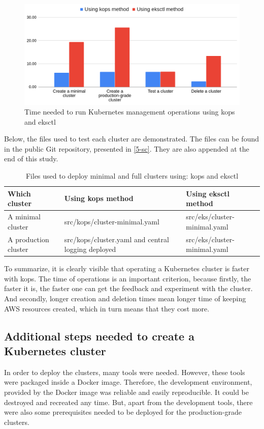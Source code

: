 \begin{figure}[H]
    \centering
    \includegraphics[width=15cm]{figures/k8s-time.png}
    \captionsetup{justification=centering,margin=2cm}
    \caption{Time needed to run Kubernetes management operations using kops and eksctl}
\end{figure}


Below, the files used to test each cluster are demonstrated. The files can be found in the public Git repository, presented in \ref{5-sc}. They are also appended at the end of this study.
\begin{table}[H]
\small
\begin{tabularx}{1\textwidth} {
  | >{\centering\arraybackslash}X
  | >{\centering\arraybackslash}X
  | >{\centering\arraybackslash}X |}
 \hline
  \textbf{Which cluster} & \textbf{Using kops method} & \textbf{Using eksctl method} \\
 \hline
 A minimal cluster & src/kops/cluster-minimal.yaml & src/eks/cluster-minimal.yaml \\
 \hline
 A production cluster & src/kops/cluster.yaml and central logging deployed & src/eks/cluster-minimal.yaml \\
 \hline
\end{tabularx}
\caption{\label{tab:comparison-which-file}Files used to deploy minimal and full clusters using: kops and eksctl}
\end{table}

To summarize, it is clearly visible that operating a Kubernetes cluster is faster with kops. The time of operations is an important criterion, because firstly, the faster it is, the faster one can get the feedback and experiment with the cluster. And secondly, longer creation and deletion times mean longer time of keeping AWS resources created, which in turn means that they cost more.

\subsection{Additional steps needed to create a Kubernetes cluster}
In order to deploy the clusters, many tools were needed. However, these tools were packaged inside a Docker image. Therefore, the development environment, provided by the Docker image was reliable and easily reproducible. It could be destroyed and recreated any time. But, apart from the development tools, there were also some prerequisites needed to be deployed for the production-grade clusters.

